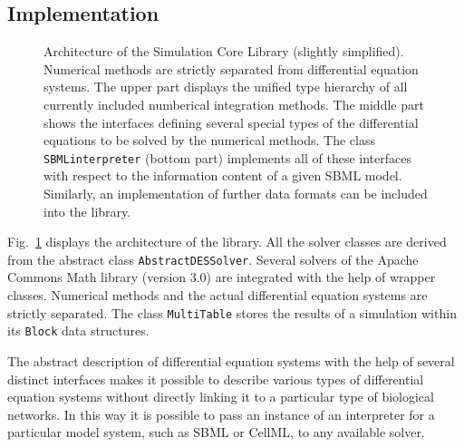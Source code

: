 \documentclass{bioinfo}
\newcommand{\AbstractDESSolver}{\texttt{Abstract\-DES\-Solver}}
\newcommand{\SBMLinterpreter}{\texttt{SBML\-interpreter}}
\newcommand{\MultiTable}{\texttt{Multi\-Table}}
\newcommand{\Block}{\texttt{Block}}
\begin{document}
\begin{methods}
\section{Implementation}
\begin{figure}
\caption[Architecture of the Simulation Core Library]{Architecture of
the Simulation Core Library (slightly simplified). Numerical methods are
strictly separated from differential equation systems. The upper part displays
the unified type hierarchy of all currently included numberical integration
methods. The middle part shows the interfaces defining several
special types of the differential equations to be solved by the numerical
methods.
The class \SBMLinterpreter{} (bottom part) implements all of these interfaces
with respect to the information content of a given SBML model. Similarly, an
implementation of further data formats can be included into the library.}
\label{fig:Architecture}
\end{figure}
Fig.~\ref{fig:Architecture} displays the architecture of the library. All the
solver classes are derived from the abstract class \AbstractDESSolver.
Several solvers of the Apache Commons Math library (version 3.0) are integrated
with the help of wrapper classes. Numerical methods and the actual differential
equation systems are strictly separated. The class \MultiTable{} stores the
results of a simulation within its \Block{} data structures. 

The abstract description of differential equation systems with the help of
several distinct interfaces makes it possible to describe various types of
differential equation systems without directly linking it to a particular type
of biological networks. In this way it is possible to pass an instance of an
interpreter for a particular model system, such as SBML or CellML, to any
available solver.


\end{methods}
\end{document}
